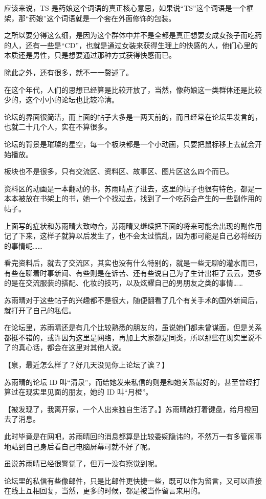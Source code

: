 应该来说，TS 是药娘这个词语的真正核心意思，如果说“TS”这个词语是一个框架，那“药娘”这个词语就是一个套在外面修饰的包装。

之所以要分得这么细，是因为这个群体中并不是全都是真正想要变成女孩子而吃药的人，还有一些是“CD”，也就是通过女装来获得生理上的快感的人，他们心里的本质还是男性，只是想要通过那种方式获得快感而已。

除此之外，还有很多，就不一一赘述了。

在这个年代，人们的思想已经算是比较开放了，当然，像药娘这一类群体还是比较少的，这个小小的论坛也比较冷清。

论坛的界面很简洁，而上面的帖子大多是一两天前的，而且经常在论坛里发言的，也就二十几个人，实在不算很多。

论坛的背景是璀璨的星空，每一个板块都是一个小动画，只要把鼠标移上去就会开始播放。

板块也不是很多，只有交流区、资料区、故事区、图片区这么四个而已。

资料区的动画是一本翻动的书，苏雨晴点了进去，这里的帖子也很有特色，都是一本本被放在书架上的书，她一个个找过去，找到了一个吃药会产生的一些副作用的帖子。

上面写的症状和苏雨晴大致吻合，苏雨晴又继续把下面的将来可能会出现的副作用记了下来，这样子就算以后发生了，也不会太过慌乱，因为那可能是自己必将经历的事情呢……

看完资料后，就去了交流区，其实也没有什么特别的，就是一些无聊的灌水而已，有些在聊着时事新闻、有些则是在诉苦、还有些说自己为了生计出柜了云云，更多的是在交流服装的搭配、化妆的技巧，以及炫耀自己的男朋友之类的事情……

苏雨晴对于这些帖子的兴趣都不是很大，随便翻看了几个有关手术的国外新闻后，就打开了自己的私信。

在论坛里，苏雨晴还是有几个比较熟悉的朋友的，虽说她们都未曾谋面，但是关系都挺不错的，或许因为这里是网络，再加上大家都是同类，所以那些在现实里说不了的真心话，都会在这里对其他人说。

【泉，最近怎么样了？好几天没见你上论坛了诶？】

苏雨晴的论坛 ID 叫“清泉”，而给她发来私信的则是和她关系最好的，甚至曾经打算过在现实里见面的朋友，她的 ID 叫“月橙”。

【被发现了，我离开家，一个人出来独自生活了。】苏雨晴敲打着键盘，给月橙回去了消息。

此时毕竟是在网吧，苏雨晴回的消息都算是比较委婉隐讳的，不然万一有多管闲事地站到自己身后看自己电脑屏幕可就不好了呢。

虽说苏雨晴已经很警觉了，但万一没有察觉到呢。

论坛里的私信有些像邮件，只是比邮件更快捷一些，既可以作为留言，又可以直接在线上互相回复，当然，更多的时候，都是被当作留言来用的。

